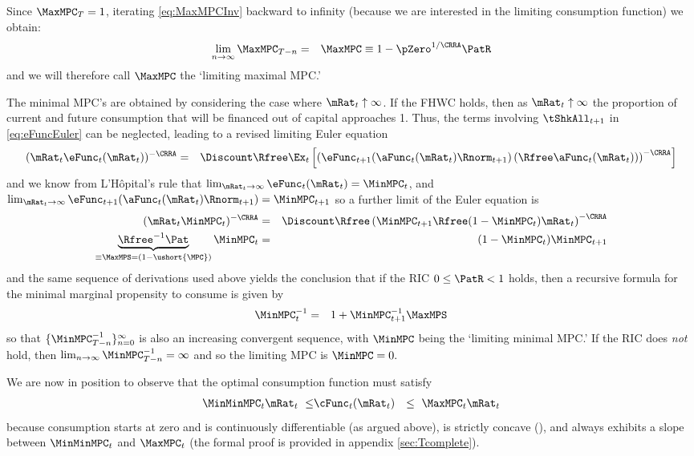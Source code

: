 \documentclass[titlepage]{\econtex}\providecommand{\texname}{BufferStockTheory}%
\begin{document}
Since $\MaxMPC_{T}=1$, iterating \eqref{eq:MaxMPCInv} backward to
infinity (because we are interested in the limiting consumption function) we obtain:
\begin{eqnarray}
\lim_{n\rightarrow\infty}\MaxMPC_{T-n} & = &
\MaxMPC \equiv 1-\pZero^{1/\CRRA}\PatR  \label{eq:MaxMPCDef}
\end{eqnarray}
and we will therefore call $\MaxMPC$ the `limiting maximal MPC.'

The minimal MPC's are obtained by considering the case where
$\mRat_{t} \uparrow \infty$.  If the FHWC holds, then as
$\mRat_{t} \uparrow \infty$ the proportion of current and future
consumption that will be financed out of capital approaches 1.  Thus,
the terms involving $\tShkAll_{t+1}$ in \eqref{eq:eFuncEuler} can be
neglected, leading to a revised limiting Euler equation
\begin{eqnarray*}
 ({\mRat_{t}}\eFunc_{t}(\mRat_{t}))^{-\CRRA} & = & \Discount \Rfree \Ex_{t}\left[\left(\eFunc_{t+1}(\aFunc_{t}(\mRat_{t})\Rnorm_{t+1})\left({\Rfree \aFunc_{t}(\mRat_{t})}\right)\right)^{-\CRRA}\right]
\end{eqnarray*}
and we know from L'H\^opital's rule that $\lim_{\mRat_{t} \rightarrow \infty} \eFunc_{t}(\mRat_{t}) = \MinMPC_{t}$, and $\lim_{\mRat_{t} \rightarrow \infty} \eFunc_{t+1}(\aFunc_{t}(\mRat_{t})\Rnorm_{t+1}) = \MinMPC_{t+1}$ so a further limit of the Euler equation is
\begin{eqnarray*}
  (\mRat_{t}\MinMPC_{t})^{-\CRRA} & = & \Discount \Rfree \left(\MinMPC_{t+1} \Rfree (1-\MinMPC_{t})\mRat_{t}\right)^{-\CRRA}
\\ \underbrace{{\Rfree}^{-1}{\Pat}}_{\equiv \MaxMPS = (1-\ushort{\MPC})} \MinMPC_{t} & = & (1-\MinMPC_{t}) \MinMPC_{t+1}
\end{eqnarray*}
and the same sequence of derivations used above yields the conclusion
that if the RIC $0 \leq \PatR < 1$ holds, then a recursive formula for the
minimal marginal propensity to consume is given by
\begin{eqnarray}
 \MinMPC_{t}^{-1} & = & 1+\MinMPC_{t+1}^{-1}\MaxMPS  \label{eq:MinMPCInv}
\end{eqnarray}
so that $\{\MinMPC_{T-n}^{-1}\}_{n=0}^{\infty}$ is also an increasing
convergent sequence, with $\MinMPC$ being the
`limiting minimal MPC.'  If the RIC does {\it not} hold, then $\lim_{n \rightarrow \infty} \MinMPC_{T-n}^{-1} = \infty$
and so the limiting MPC is $\MinMPC = 0.$

We are now in position to observe that the optimal consumption function must satisfy
\begin{eqnarray}
  \MinMinMPC_{t} \mRat_{t} ~ \leq &   \cFunc_{t}(\mRat_{t}) & \leq  ~ \MaxMPC_{t} \mRat_{t} \label{eq:cBounds}
\end{eqnarray}
because consumption starts at zero and is continuously
differentiable (as argued above), is strictly
concave (\cite{carroll&kimball:concavity}), and always exhibits a
slope between $\MinMinMPC_{t}$ and $\MaxMPC_{t}$ (the formal proof is provided in appendix \ref{sec:Tcomplete}).
\end{document}
